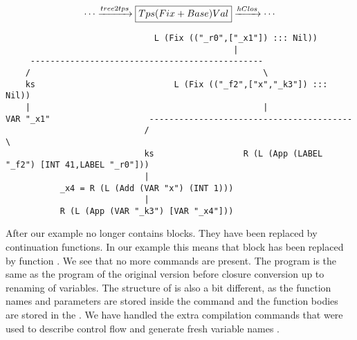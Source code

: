 \begin{landscape}
\begin{gather*}
  \cdots \xrightarrow{tree2tps} \boxed{Tps (Fix + Base) Val} \xrightarrow{hClos} \cdots
\end{gather*}
\begin{lstlisting}
                              L (Fix (("_r0",["_x1"]) ::: Nil))
                                              |
     -----------------------------------------------
    /                                               \
    ks                            L (Fix (("_f2",["x","_k3"]) ::: Nil))
    |                                               |
VAR "_x1"                    -----------------------------------------
                            /                                         \
                            ks                  R (L (App (LABEL "_f2") [INT 41,LABEL "_r0"]))
                            |
           _x4 = R (L (Add (VAR "x") (INT 1)))
                            |
           R (L (App (VAR "_k3") [VAR "_x4"]))

\end{lstlisting}
After  our example no longer contains blocks. They have been replaced by continuation functions. In our example this means that block  has been replaced by function . We see that no more  commands are present. The program is the same as the program of the original version before closure conversion up to renaming of variables. The structure of  is also a bit different, as the function names and parameters are stored inside the  command and the function bodies are stored in the  . We have handled the extra compilation commands that were used to describe control flow  and generate fresh variable names .
\end{landscape}
\clearpage

